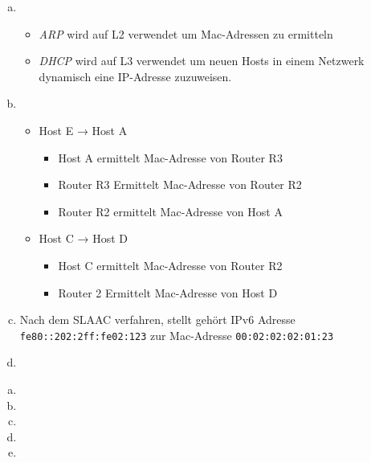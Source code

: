 \begin{enumerate}[a)]
	
	\item \begin{itemize}
		\item \textit{ARP} wird auf L2 verwendet um Mac-Adressen zu ermitteln
		\item \textit{DHCP} wird auf L3 verwendet um neuen Hosts in einem Netzwerk 
		dynamisch eine IP-Adresse zuzuweisen.
	\end{itemize}
	
	\item 
	\begin{itemize} 
		\item Host E → Host A 
		\begin{itemize}
			\item Host A ermittelt Mac-Adresse von Router R3
			\item Router R3 Ermittelt Mac-Adresse von Router R2
			\item Router R2 ermittelt Mac-Adresse von Host A
		\end{itemize}
		\item Host C → Host D
		\begin{itemize}
			\item Host C ermittelt Mac-Adresse von Router R2
			\item Router 2 Ermittelt Mac-Adresse von Host D
		\end{itemize}
	\end{itemize}

	\item Nach dem SLAAC verfahren, stellt gehört IPv6 Adresse \texttt{fe80::202:2ff:fe02:123} zur Mac-Adresse \texttt{00:02:02:02:01:23}
	
	\item 

\end{enumerate}

\begin{enumerate}[a)]
	
	\item 
	
	\item 
	
	\item 
	
	\item 
	
	\item 

\end{enumerate}





